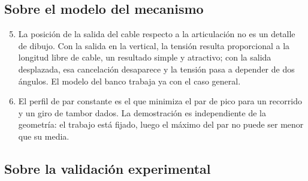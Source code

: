 \subsection{Sobre el modelo del mecanismo}

\begin{enumerate}\setcounter{enumi}{4}
  \item La posición de la salida del cable respecto a la articulación no es un detalle de dibujo.
        Con la salida en la vertical, la tensión resulta proporcional a la longitud libre de cable,
        un resultado simple y atractivo; con la salida desplazada, esa cancelación desaparece y la
        tensión pasa a depender de dos ángulos. El modelo del banco trabaja ya con el caso general.
  \item El perfil de par constante es el que minimiza el par de pico para un recorrido y un giro de
        tambor dados. La demostración es independiente de la geometría: el trabajo está fijado, luego
        el máximo del par no puede ser menor que su media.
\end{enumerate}

\subsection{Sobre la validación experimental}

